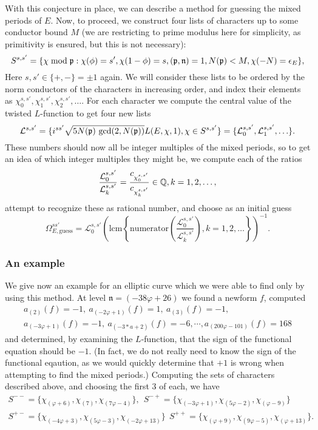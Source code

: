 \documentclass{amsart}
\newcommand{\n}{\mathfrak{n}}
\begin{document}
With this conjecture in place, we can describe a method for guessing the mixed periods of
$E$.
Now, to proceed, we construct four lists of characters
up to some conductor bound $M$ (we are restricting to prime modulus here for simplicity,
as primitivity is ensured, but this is not necessary):
\[
    S^{s,s'} = \{ \chi \bmod \p : \chi(\phi) = s', \chi(1 - \phi) = s,
            (\p, \n) = 1, N(\p) < M, \chi(-N) = \epsilon_E\},
\]
Here $s, s' \in \{+, -\} = \pm 1$ again. We will consider these lists to be ordered by the
norm conductors of the characters in increasing order, and index their elements as
$\chi^{s,s'}_0, \chi^{s,s'}_1, \chi^{s,s'}_2, \ldots$. For each character we compute the central
value of the twisted $L$-function to get four new lists
\[
    \mathcal{L}^{s,s'} = \{ i^{ss'}\sqrt{5 N(\mathfrak{p})\ \mathrm{gcd}(2, N(\mathfrak{p})) } L(E,\chi,1), \chi \in S^{s,s'}\} =
        \{\mathcal{L}^{s,s'}_0, \mathcal{L}^{s,s'}_1, \ldots\}.
\]
These numbers should now all be integer multiples of the mixed periods, so to get an idea
of which integer multiples they might be, we compute each of the ratios 
\[
    \frac{\mathcal{L}^{s,s'}_0}{\mathcal{L}^{s,s'}_k} = \frac{c_{\chi^{s,s'}_0}}{c_{\chi^{s,s'}_k}} \in \mathbb{Q}, k = 1, 2, \ldots,
\]
attempt to recognize these as rational number, and 
choose as an initial guess
\[
    \Omega^{ss'}_{E, \mathrm{guess}} = \mathcal{L}^{s,s'}_0\left(\mathrm{lcm}\left\{ \mathrm{numerator}\left(\frac{\mathcal{L}^{s,s'}_0}{\mathcal{L}^{s,s'}_k}\right), k = 1,2, \ldots \right\}\right)^{-1}.
\]

\subsubsection{An example}
We give now an example for an elliptic curve which we were able to find only by using
this method. At level $\n = (-38\varphi + 26)$ we found a newform $f$, computed
\begin{multline*}
    a_{(2)}(f) = -1,\  a_{(-2\varphi + 1)}(f) = 1,\  a_{(3)}(f) = -1, \\ 
    a_{(-3\varphi + 1)}(f) = -1,\  a_{(-3*a + 2)}(f) = -6, \cdots, a_{(200\varphi - 101)}(f) = 168
\end{multline*}
and determined, by examining the $L$-function, that the sign of the functional equation
should be $-1$. (In fact, we do not really need to know the sign of the functional eqaution,
as we would quickly determine that $+1$ is wrong when attempting to find the mixed periods.)
Computing the sets of characters described above, and choosing the first $3$ of each, we
have
\begin{multline*}
S^{--} = \{\chi_{(\varphi + 6)}, \chi_{(7)}, \chi_{(7\varphi - 4)}\}, \ \ 
    S^{-+} = \{\chi_{(-3\varphi + 1)}, \chi_{(5 \varphi - 2)}, \chi_{(\varphi - 9)}\} \\
S^{+-} = \{\chi_{(-4\varphi + 3)}, \chi_{(5\varphi - 3)}, \chi_{(-2\varphi + 13)} \} \ \ 
    S^{++} = \{\chi_{(\varphi + 9)}, \chi_{(9\varphi - 5)}, \chi_{(\varphi + 13)} \}.
\end{multline*}
\end{document}
